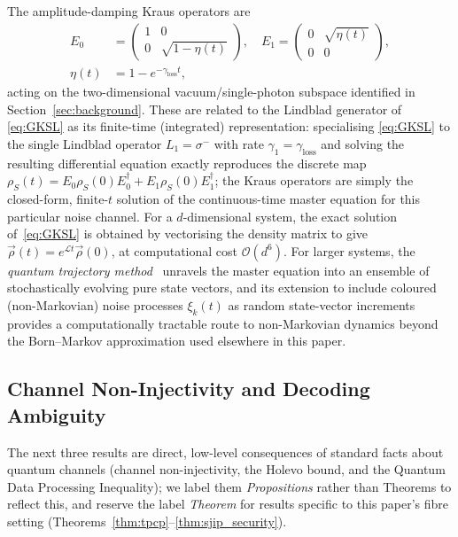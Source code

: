 \documentclass[journal,twocolumn]{IEEEtran}
\theoremstyle{definition}
\theoremstyle{plain}
\begin{document}
The amplitude-damping Kraus operators are
\begin{align}
  E_0 &= \begin{pmatrix}1 & 0 \\ 0 & \sqrt{1-\eta(t)}\end{pmatrix},
  \quad
  E_1 = \begin{pmatrix}0 & \sqrt{\eta(t)} \\ 0 & 0\end{pmatrix},
  \label{eq:kraus}\\
  \eta(t) &= 1 - e^{-\gamma_{\mathrm{loss}} t}, \nonumber
\end{align}
acting on the two-dimensional vacuum/single-photon subspace
identified in Section~\ref{sec:background}. These are related to the
Lindblad generator of \eqref{eq:GKSL} as its finite-time
(integrated) representation: specialising \eqref{eq:GKSL} to the
single Lindblad operator $L_1=\sigma^-$ with rate
$\gamma_1=\gamma_{\mathrm{loss}}$ and solving the resulting
differential equation exactly reproduces the discrete map
$\rho_S(t) = E_0\rho_S(0)E_0^\dagger + E_1\rho_S(0)E_1^\dagger$; the
Kraus operators are simply the closed-form, finite-$t$ solution of
the continuous-time master equation for this particular noise
channel.  For a $d$-dimensional
system, the exact solution of~\eqref{eq:GKSL} is obtained by
vectorising the density matrix to give $\vec\rho(t) =
e^{\mathcal{L}t}\vec\rho(0)$, at computational cost
$\mathcal{O}(d^6)$.  For larger systems, the \emph{quantum
trajectory method}~\cite{dalibard1992,carmichael1993} unravels the
master equation into an ensemble of stochastically evolving pure
state vectors, and its extension to include coloured (non-Markovian)
noise processes $\xi_k(t)$ as random state-vector increments
provides a computationally tractable route to non-Markovian dynamics
beyond the Born--Markov approximation used elsewhere in this paper.

\subsection{Channel Non-Injectivity and Decoding Ambiguity}

The next three results are direct, low-level consequences of
standard facts about quantum channels (channel non-injectivity, the
Holevo bound, and the Quantum Data Processing Inequality); we label
them \emph{Propositions} rather than Theorems to reflect this, and
reserve the label \emph{Theorem} for results specific to this
paper's fibre setting (Theorems~\ref{thm:tpcp}--\ref{thm:sjip_security}).
\end{document}
